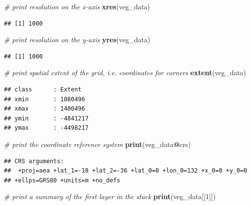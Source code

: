 \documentclass[12pt,]{book}
\newenvironment{Shaded}{\begin{snugshade}}{\end{snugshade}}
\newcommand{\KeywordTok}[1]{\textcolor[rgb]{0.13,0.29,0.53}{\textbf{#1}}}
\newcommand{\DecValTok}[1]{\textcolor[rgb]{0.00,0.00,0.81}{#1}}
\newcommand{\CommentTok}[1]{\textcolor[rgb]{0.56,0.35,0.01}{\textit{#1}}}
\newcommand{\OperatorTok}[1]{\textcolor[rgb]{0.81,0.36,0.00}{\textbf{#1}}}
\newcommand{\NormalTok}[1]{#1}
\begin{document}
\begin{Shaded}
\begin{Highlighting}[]
\CommentTok{# print  resolution on the x-axis}
\KeywordTok{xres}\NormalTok{(veg_data)}
\end{Highlighting}
\end{Shaded}

\begin{verbatim}
## [1] 1000
\end{verbatim}

\begin{Shaded}
\begin{Highlighting}[]
\CommentTok{# print resolution on the y-axis}
\KeywordTok{yres}\NormalTok{(veg_data)}
\end{Highlighting}
\end{Shaded}

\begin{verbatim}
## [1] 1000
\end{verbatim}

\begin{Shaded}
\begin{Highlighting}[]
\CommentTok{# print spatial extent of the grid, i.e. coordinates for corners}
\KeywordTok{extent}\NormalTok{(veg_data)}
\end{Highlighting}
\end{Shaded}

\begin{verbatim}
## class      : Extent 
## xmin       : 1080496 
## xmax       : 1400496 
## ymin       : -4841217 
## ymax       : -4498217
\end{verbatim}

\begin{Shaded}
\begin{Highlighting}[]
\CommentTok{# print the coordinate reference system}
\KeywordTok{print}\NormalTok{(veg_data}\OperatorTok{@}\NormalTok{crs)}
\end{Highlighting}
\end{Shaded}

\begin{verbatim}
## CRS arguments:
##  +proj=aea +lat_1=-18 +lat_2=-36 +lat_0=0 +lon_0=132 +x_0=0 +y_0=0
## +ellps=GRS80 +units=m +no_defs
\end{verbatim}

\begin{Shaded}
\begin{Highlighting}[]
\CommentTok{# print a summary of the first layer in the stack}
\KeywordTok{print}\NormalTok{(veg_data[[}\DecValTok{1}\NormalTok{]])}
\end{Highlighting}
\end{Shaded}
\end{document}
